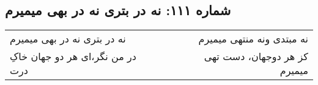 \begin{center}
\section*{شماره ۱۱۱: نه در بتری نه در بهی میمیرم}
\label{sec:111}
\begin{longtable}{l p{0.5cm} r}
نه در بتری نه در بهی میمیرم
&&
نه مبتدی ونه منتهی میمیرم
\\
در من نگر،‌ای هر دو جهان خاکِ درت
&&
کز هر دوجهان، دست تهی میمیرم
\\
\end{longtable}
\end{center}

